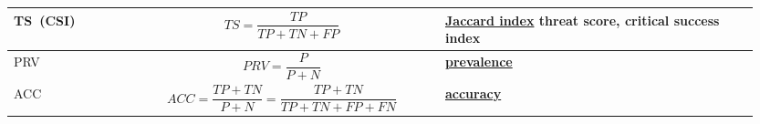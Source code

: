\documentclass[]{scrreprt}
\begin{document}
\begin{table}[ht]
\begin{tabularx}{\textwidth}{p{0.15\linewidth} p{0.4\linewidth} p{0.4\linewidth}}
		TS~(CSI)&\begin{equation}\label{eq:TS|CSI}
		TS = \frac{TP}{TP+TN+FP}
		\end{equation}&\href{https://en.wikipedia.org/wiki/Jaccard_index\#Jaccard_index_in_binary_classification_confusion_matrices}{Jaccard index} \textbf{threat score}, \textbf{critical success index}~\cite{Wiki:jaccard-index}\\
		\hline
		PRV&\begin{equation}\label{eq:PRV}
		PRV = \frac{P}{P+N}
		\end{equation}&\href{https://en.wikipedia.org/wiki/Prevalence}{\textbf{prevalence}}~\cite{Wiki:prevalence}\\
		\hline
		ACC&\begin{equation}\label{eq:ACC}
		ACC = \frac{TP+TN}{P+N} = \frac{TP+TN}{TP+TN+FP+FN}
		\end{equation}&\href{https://en.wikipedia.org/wiki/Accuracy_and_precision}{\textbf{accuracy}}~\cite{Wiki:accuracy-precision}\\
		\hline
	\end{tabularx}
	\normalsize
\end{table}
%
\end{document}
